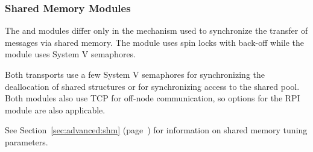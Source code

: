 
\subsubsection{Shared Memory  Modules}
\label{sec:configure:options:ssi:shmem}

The  and  modules differ only in the mechanism
used to synchronize the transfer of messages via shared memory.  The
 module uses spin locks with back-off while the 
module uses System V semaphores.

Both transports use a few System V semaphores for synchronizing the
deallocation of shared structures or for synchronizing access to the
shared pool.  Both modules also use TCP for off-node communication, so
options for the  RPI module are also applicable.

See Section~\ref{sec:advanced:shm} (page~\pageref{sec:advanced:shm})
for information on shared memory tuning parameters.

